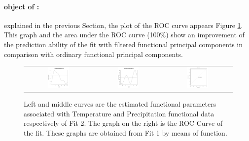 \paragraph{ object of :} explained in the previous Section, the plot of the ROC curve appears Figure \ref{Fit2}. This graph and the area under the ROC curve (100\%) show an improvement of the prediction ability of the fit with filtered functional principal components in comparison with ordinary functional principal components.

\begin{figure}
\begin{center}
\begin{tabular}{ccc}
\includegraphics[width=0.33\textwidth]{Graphs/Fit2FunParam1.png} & \includegraphics[width=0.33\textwidth]{Graphs/Fit2FunParam2.png} 
& \includegraphics[width=0.33\textwidth]{Graphs/Fit2ROC.png}\\
\end{tabular}
\end{center}
\caption{Left and middle curves are the estimated functional parameters associated with Temperature and Precipitation functional data respectively of Fit 2. The graph on the right is the ROC Curve of the fit. These graphs are obtained from Fit 1 by means of  function.}
\label{Fit2}
\end{figure}

